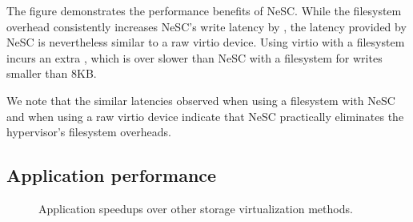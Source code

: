 The figure demonstrates the performance benefits of NeSC. While the filesystem overhead consistently increases NeSC's write latency by \us, the latency provided by NeSC is nevertheless similar to a raw virtio device. Using virtio with a filesystem incurs an extra \us, which is over  slower than NeSC with a filesystem for writes smaller than 8KB.

We note that the similar latencies observed when using a filesystem with NeSC and when using a raw virtio device indicate that NeSC practically eliminates the hypervisor's filesystem overheads.

\subsection{Application performance}

\begin{figure}[t]

  \centering
  \caption{Application speedups over other storage virtualization methods.\label{fig:apps}}

    
\end{figure}

